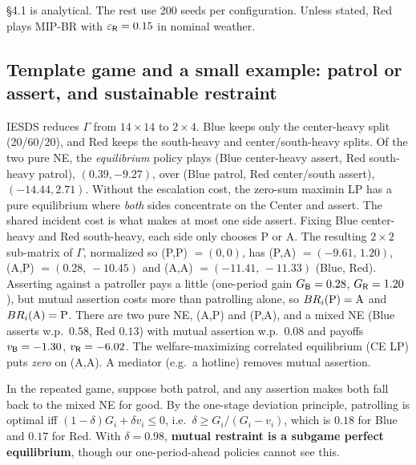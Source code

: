 \S4.1 is analytical. The rest use 200 seeds per configuration.
Unless stated, Red plays MIP-BR with $\varepsilon_{\mathsf{R}}=0.15$ in nominal weather.

\subsection{Template game and a small example: patrol or assert, and sustainable restraint}
IESDS reduces $\Gamma$ from $14\times14$ to $2\times4$. Blue keeps only the center-heavy split (20/60/20), and Red
keeps the south-heavy and center/south-heavy splits. Of the two pure NE, the \emph{equilibrium} policy plays (Blue center-heavy
assert, Red south-heavy patrol), $(0.39,-9.27)$, over (Blue patrol, Red center/south assert), $(-14.44,2.71)$.
Without the escalation cost, the zero-sum maximin LP has a pure equilibrium where \emph{both} sides concentrate on
the Center and assert. The shared incident cost is what makes at most one side assert.
Fixing Blue center-heavy and Red south-heavy, each side only chooses P or A. The resulting $2\times2$ sub-matrix of $\Gamma$, normalized so (P,P) $=(0,0)$, has
(P,A) $=(-9.61,\,1.20)$, (A,P) $=(0.28,\,-10.45)$ and (A,A) $=(-11.41,\,-11.33)$ (Blue, Red).
Asserting against a patroller pays a little (one-period gain $G_{\mathsf{B}}=0.28$, $G_{\mathsf{R}}=1.20$), but mutual assertion costs more than
patrolling alone, so $BR_i(\mathrm{P})=\mathrm{A}$ and $BR_i(\mathrm{A})=\mathrm{P}$. There are two pure NE, (A,P) and (P,A), and a mixed NE (Blue asserts w.p.\
$0.58$, Red $0.13$) with mutual assertion w.p.\ $0.08$ and payoffs $v_{\mathsf{B}}=-1.30$, $v_{\mathsf{R}}=-6.02$. The welfare-maximizing correlated equilibrium (CE LP)
puts \emph{zero} on (A,A). A mediator (e.g.\ a hotline) removes mutual assertion.

In the repeated game, suppose both patrol, and any assertion makes both fall back to the
mixed NE for good. By the one-stage deviation principle, patrolling is optimal iff
$(1-\delta)G_i+\delta v_i\le0$, i.e.\ $\delta\ge G_i/(G_i-v_i)$, which is $0.18$ for Blue and $0.17$ for Red. With
$\delta=0.98$, \textbf{mutual restraint is a subgame perfect equilibrium}, though our one-period-ahead policies
cannot see this.

